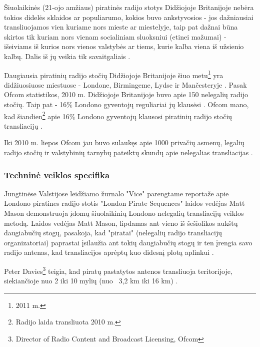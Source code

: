 \documentclass[kursinis-darbas]{vukf}
\begin{document}
Šiuolaikinės (21-ojo amžiaus) piratinės radijo stotys Didžiojoje Britanijoje nebėra tokios didelės sklaidos ar populiarumo, kokios buvo ankstyvosios - jos dažniausiai transliuojamos vien kuriame nors mieste ar miestelyje, taip pat dažnai būna skirtos tik kuriam nors vienam socialiniam sluoksniui (etinei mažumai) - išeiviams iš kurios nors vienos valstybės ar tiems, kurie kalba viena iš užsienio kalbų. Dalis iš jų veikia tik savaitgaliais \cite[p.~238]{chs_encyclopedia_of_radio}.

Daugiausia piratinių radijo stočių Didžiojoje Britanijoje šiuo metu\footnote{2011 m.} yra didžiuosiuose miestuose - Londone, Birmingeme, Lydse ir Mančesteryje \cite{ofcom_illegal_broadcasting_factsheet}. Pasak \gls{Ofcom} statistikos, 2010 m. Didžiojoje Britanijoje buvo apie 150 nelegalių radijo stočių. Taip pat - 16\% Londono gyventojų reguliariai jų klausėsi \cite{bbc_radio_4_do_pirates_rule_the_air_waves}. \gls{Ofcom} mano, kad šiandien\footnote{Radijo laida transliuota 2010 m.} apie 16\% Londono gyventojų klausosi piratinių radijo stočių transliacijų \cite{bbc_radio_4_do_pirates_rule_the_air_waves}.

Iki 2010 m. liepos \gls{Ofcom} jau buvo sulaukęs apie 1000 privačių asmenų, legalių radijo stočių ir valstybinių tarnybų pateiktų skundų apie nelegalias transliacijas \cite{bbc_radio_4_do_pirates_rule_the_air_waves}.


\subsubsection{Techninė veiklos specifika}

Jungtinėse Valstijose leidžiamo žurnalo "Vice" parengtame reportaže apie Londono piratines radijo stotis "London Pirate Sequences" \cite{vice_london_pirate_sequences} laidos vedėjas Matt Mason demonstruoja įdomų šiuolaikinių Londono nelegalių transliacijų veiklos metodą. Laidos vedėjas Matt Mason, lipdamas ant vieno iš šešiolikos aukštų daugiabučių stogų, pasakoja, kad "piratai" (nelegalių radijo transliacijų organizatoriai) paprastai įsilaužia ant tokių daugiabučių stogų ir ten įrengia savo radijo antenas, kad transliacijos aprėptų kuo didesnį plotą aplinkui \cite{vice_london_pirate_sequences}.

Peter Davies\footnote{Director of Radio Content and Broadcast Licensing, \gls{Ofcom}} teigia, kad piratų pastatytos antenos transliuoja teritorijoje, siekiančioje nuo 2 iki 10 mylių (nuo ~3,2 km iki 16 km) \cite{bbc_radio_4_do_pirates_rule_the_air_waves}.
\end{document}
